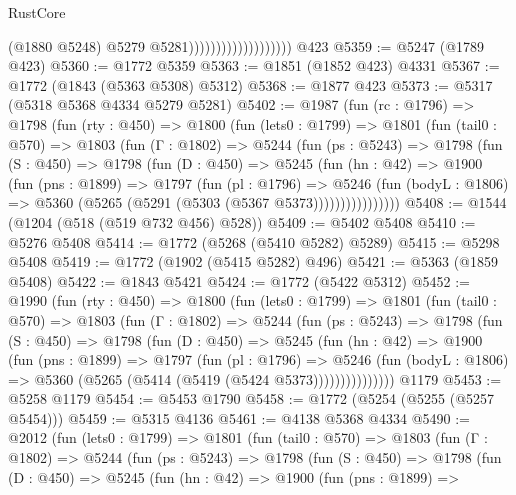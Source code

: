 \begin{lexlean}{RustCore}
\begin{coremodule}
                                          (@1880 @5248)
                                          @5279
                                          @5281)))))))))))))))))))
    @423
@5359 := @5247 (@1789 @423)
@5360 := @1772 @5359
@5363 := @1851 (@1852 @423) @4331
@5367 := @1772 (@1843 (@5363 @5308) @5312)
@5368 := @1877 @423
@5373 := @5317 (@5318 @5368 @4334 @5279 @5281)
@5402 := @1987
    (fun (rc : @1796) =>
    @1798
      (fun (rty : @450) =>
      @1800
        (fun (lets0 : @1799) =>
        @1801
          (fun (tail0 : @570) =>
          @1803
            (fun (Γ : @1802) =>
            @5244
              (fun (ps : @5243) =>
              @1798
                (fun (S : @450) =>
                @1798
                  (fun (D : @450) =>
                  @5245
                    (fun (hn : @42) =>
                    @1900
                      (fun (pns : @1899) =>
                      @1797
                        (fun (pl : @1796) =>
                        @5246
                          (fun (bodyL : @1806) =>
                          @5360 (@5265 (@5291 (@5303 (@5367 @5373))))))))))))))))
@5408 := @1544 (@1204 (@518 (@519 @732 @456) @528))
@5409 := @5402 @5408
@5410 := @5276 @5408
@5414 := @1772 (@5268 (@5410 @5282) @5289)
@5415 := @5298 @5408
@5419 := @1772 (@1902 (@5415 @5282) @496)
@5421 := @5363 (@1859 @5408)
@5422 := @1843 @5421
@5424 := @1772 (@5422 @5312)
@5452 := @1990
    (fun (rty : @450) =>
    @1800
      (fun (lets0 : @1799) =>
      @1801
        (fun (tail0 : @570) =>
        @1803
          (fun (Γ : @1802) =>
          @5244
            (fun (ps : @5243) =>
            @1798
              (fun (S : @450) =>
              @1798
                (fun (D : @450) =>
                @5245
                  (fun (hn : @42) =>
                  @1900
                    (fun (pns : @1899) =>
                    @1797
                      (fun (pl : @1796) =>
                      @5246
                        (fun (bodyL : @1806) =>
                        @5360 (@5265 (@5414 (@5419 (@5424 @5373)))))))))))))))
    @1179
@5453 := @5258 @1179
@5454 := @5453 @1790
@5458 := @1772 (@5254 (@5255 (@5257 @5454)))
@5459 := @5315 @4136
@5461 := @4138 @5368 @4334
@5490 := @2012
    (fun (lets0 : @1799) =>
    @1801
      (fun (tail0 : @570) =>
      @1803
        (fun (Γ : @1802) =>
        @5244
          (fun (ps : @5243) =>
          @1798
            (fun (S : @450) =>
            @1798
              (fun (D : @450) =>
              @5245
                (fun (hn : @42) =>
                @1900
                  (fun (pns : @1899) =>

\end{coremodule}
\end{lexlean}
